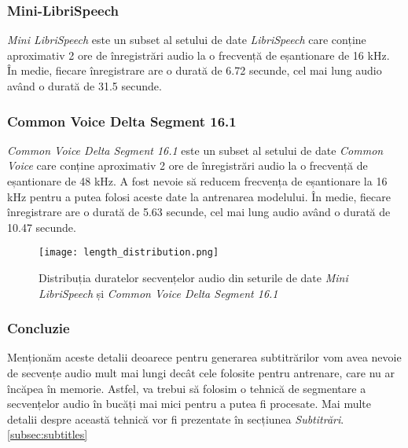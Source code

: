 \subsubsection{Mini-LibriSpeech}
\textit{Mini LibriSpeech} este un subset al setului de date \textit{LibriSpeech} care conține 
aproximativ 2 ore de înregistrări audio la o frecvență de eșantionare de 16 kHz. În medie,
fiecare înregistrare are o durată de 6.72 secunde, cel mai lung audio având o durată de 31.5 secunde.

\subsubsection{Common Voice Delta Segment 16.1}
\textit{Common Voice Delta Segment 16.1} este un subset al setului de date \textit{Common Voice}
care conține aproximativ 2 ore de înregistrări audio la o frecvență de eșantionare de 48 kHz.
A fost nevoie să reducem frecvența de eșantionare la 16 kHz pentru a putea folosi aceste date la
antrenarea modelului. În medie, fiecare înregistrare are o durată de 5.63 secunde, cel mai lung
audio având o durată de 10.47 secunde.

\begin{figure}[h]
    \centering
    \texttt{[image: length\_distribution.png]}
    \caption{Distribuția duratelor secvențelor audio din seturile de date \textit{Mini LibriSpeech} și \textit{Common Voice Delta Segment 16.1}}
    \label{fig:length-distribution}
\end{figure}

\subsubsection{Concluzie}
Menționăm aceste detalii deoarece pentru generarea subtitrărilor vom avea nevoie de secvențe audio
mult mai lungi decât cele folosite pentru antrenare, care nu ar încăpea în memorie. Astfel, va trebui
să folosim o tehnică de segmentare a secvențelor audio în bucăți mai mici pentru a putea fi procesate.
Mai multe detalii despre această tehnică vor fi prezentate în secțiunea \textit{Subtitrări}. \ref{subsec:subtitles}

